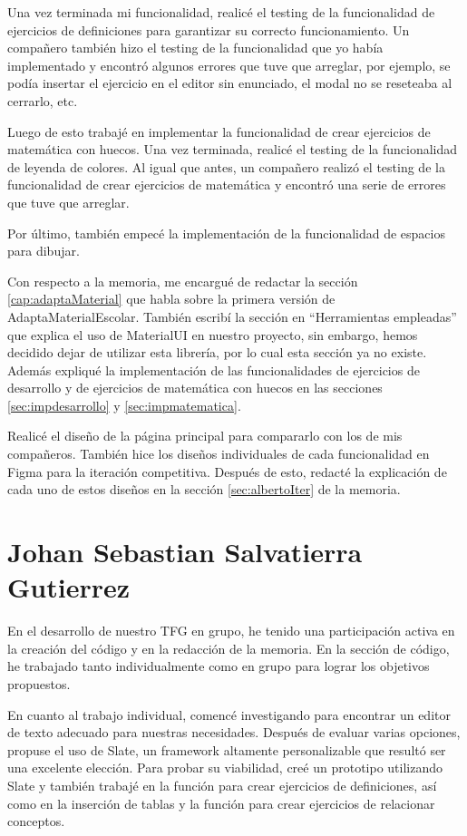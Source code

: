 Una vez terminada mi funcionalidad, realicé el testing de la funcionalidad de ejercicios de definiciones para garantizar su correcto funcionamiento. Un compañero también hizo el testing de la funcionalidad que yo había implementado y encontró algunos errores que tuve que arreglar, por ejemplo, se podía insertar el ejercicio en el editor sin enunciado, el modal no se reseteaba al cerrarlo, etc.

Luego de esto trabajé en implementar la funcionalidad de crear ejercicios de matemática con huecos. Una vez terminada, realicé el testing de la funcionalidad de leyenda de colores. Al igual que antes, un compañero realizó el testing de la funcionalidad de crear ejercicios de matemática y encontró una serie de errores que tuve que arreglar.

Por último, también empecé la implementación de la funcionalidad de espacios para dibujar.

Con respecto a la memoria, me encargué de redactar la sección \ref{cap:adaptaMaterial} que habla sobre la primera versión de AdaptaMaterialEscolar. También escribí la sección en “Herramientas empleadas” que explica el uso de MaterialUI en nuestro proyecto, sin embargo, hemos decidido dejar de utilizar esta librería, por lo cual esta sección ya no existe. Además expliqué la implementación de las funcionalidades de ejercicios de desarrollo y de ejercicios de matemática con huecos en las secciones \ref{sec:impdesarrollo} y \ref{sec:impmatematica}.

Realicé el diseño de la página principal para compararlo con los de mis compañeros. También hice los diseños individuales de cada funcionalidad en Figma para la iteración competitiva. Después de esto, redacté la explicación de cada uno de estos diseños en la sección \ref{sec:albertoIter} de la memoria.


\section{Johan Sebastian Salvatierra Gutierrez}
En el desarrollo de nuestro TFG en grupo, he tenido una participación activa en la creación del código y en la redacción de la memoria. En la sección de código, he trabajado tanto individualmente como en grupo para lograr los objetivos propuestos.

En cuanto al trabajo individual, comencé investigando para encontrar un editor de texto adecuado para nuestras necesidades. Después de evaluar varias opciones, propuse el uso de Slate, un framework altamente personalizable que resultó ser una excelente elección. Para probar su viabilidad, creé un prototipo utilizando Slate y también trabajé en la función para crear ejercicios de definiciones, así como en la inserción de tablas y la función para crear ejercicios de relacionar conceptos.

